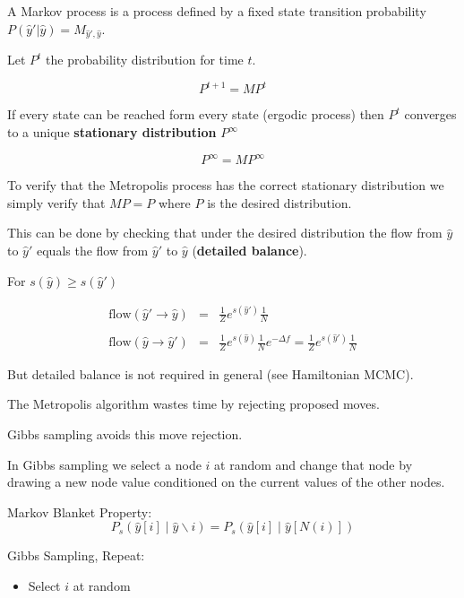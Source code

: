 {A Markov process is a process defined by a fixed state transition probability $P(\hat{y}'|\hat{y}) = M_{\hat{y}',\hat{y}}$.

\vfill
Let $P^t$ the probability distribution for time $t$.

\vfill
$$P^{t+1} = MP^t$$

\vfill
If every state can be reached form every state (ergodic process) then $P^t$ converges to a unique {\bf stationary distribution} $P^\infty$

\vfill
$$P^\infty = MP^\infty$$


To verify that the Metropolis process has the correct stationary distribution we simply verify that $MP = P$ where $P$
is the desired distribution.

\vfill
This can be done by checking that under the desired distribution the flow from $\hat{y}$ to $\hat{y}'$
equals the flow from $\hat{y}'$ to $\hat{y}$ ({\bf detailed balance}).


For $s(\hat{y}) \geq s(\hat{y}')$

\vfill
\begin{eqnarray*}
  \mathrm{flow}(\hat{y}' \rightarrow \hat{y}) &  = & \frac{1}{Z}e^{s(\hat{y}')} \frac{1}{N} \\
  \\
\mathrm{flow}(\hat{y} \rightarrow \hat{y}') & = & \frac{1}{Z}e^{s(\hat{y})} \frac{1}{N} e^{-\Delta f} = \frac{1}{Z} e^{s(\hat{y}')} \frac{1}{N}
\end{eqnarray*}

\vfill
But detailed balance is not required in general (see Hamiltonian MCMC).


The Metropolis algorithm wastes time by rejecting proposed moves.

\vfill
Gibbs sampling avoids this move rejection.

\vfill
In Gibbs sampling we select a node $i$ at random and change that node by drawing a new node value conditioned on the current values of the other nodes.


Markov Blanket Property:
$$P_s(\hat{y}[i] \;|\;\hat{y} \backslash i) = P_s(\hat{y}[i] \;|\; \hat{y}[N(i)])$$
  
\vfill
Gibbs Sampling, Repeat:

\begin{itemize}
\item   Select $i$ at random


\end{itemize}}
